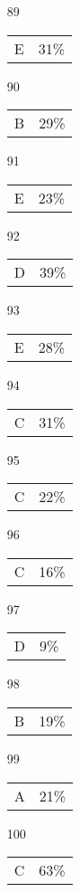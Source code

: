 \documentclass{article}
\begin{document}
\begin{multicols}{4}
\begin{enumerate}
    \item[89] \begin{tabular}{cc} E & 31\%\end{tabular}
    
    \item[90] \begin{tabular}{cc} B & 29\%\end{tabular}
    
       \item[]
    
    \item[91] \begin{tabular}{cc} E & 23\%\end{tabular}

    \item[92] \begin{tabular}{cc} D & 39\%\end{tabular}
    
    \item[93] \begin{tabular}{cc} E & 28\%\end{tabular}
    
    \item[94] \begin{tabular}{cc} C & 31\%\end{tabular}
    
    \item[95] \begin{tabular}{cc} C & 22\%\end{tabular}
    
       \item[]
    
    \item[96] \begin{tabular}{cc} C & 16\%\end{tabular}
    
    \item[97] \begin{tabular}{cc} D & 9\%\end{tabular}
    
    \item[98] \begin{tabular}{cc} B & 19\%\end{tabular}
    
    \item[99] \begin{tabular}{cc} A & 21\%\end{tabular}
    
    \item[100] \begin{tabular}{cc} C & 63\%\end{tabular}
    
       \item[]
    
\end{enumerate}
\end{multicols}
\end{document}
